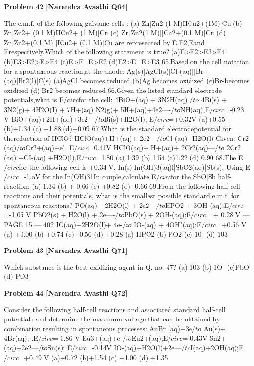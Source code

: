 \begin{problembox}
\textbf{Problem 42} \hfill \textbf{[Narendra Avasthi Q64]}
\label{q:ext-narendra_avasthi_all_questions-42}

The e.m.f. of the following galvanic cells :
(a) Zn|Zn$2$ (1 M)IICu2+(1M)|Cu
(b) Zn|Zn2+ (0.1 M)IICu2+ (1 M)|Cu
(c) Zn|Zn$2$(1 M)||Cu$2$+(0.1 M)|Cu
(d) Zn|Zn2+(0.1 M) |ICu2+ (0.1 M)|Cu
are represented by E,E2,Eand Erespectively.Which of the following statement is true?
(a)E>E2>E3>E4
(b)E3>E2>E>E4
(c)E>E=E>E2
(d)E2>E=E>E3
65.Based on the cell notation for a spontaneous reaction,at the anode:
Ag(s)|AgCl(s)|Cl-(aq)||Br-(aq)|Br2(l)|C(s)
(a)AgCl becomes reduced
(b)Ag becomes oxidized
(c)Br-becomes oxidized
(d) Br2 becomes reduced
66.Given the listed standard electrode potentials,what is E$/circ$for the cell:
4BiO+(aq) + 3N2H(aq) $/to$ 4Bi(s) + 3N2(g)+ 4H2O(I) + 7H+(aq)
N2(g)+ 5H+(aq)+4e$2$----$/to$NH(aq),E$/circ$=-0.23 V
BiO+(aq)+2H+(aq)+3e$2$---$/to$Bi(s)+H2O(l), E$/circ$=+0.32V
(a)+0.55
(b)+0.34
(c) +1.88
(d)+0.09
67.What is the standard electrodepotential for thereduction of HClO?
HClO(aq)+H+(aq)+ 2e$2$---$/to$Cl-(aq)+H2O(l)
Given:
Cr$2$(aq)$/to$Cr$2$+(aq)+e", E$/circ$=0.41V
HClO(aq)+ H+(aq)+ 2Cr$2$(aq)---$/to$ 2Cr$2$(aq) +CI-(aq) +H2O(l),E$/circ$=1.80
(a) 1.39
(b) 1.54
(c)1.22
(d) 0.90
68.The E$/circ$for the following cell is +0.34 V. In(s)|In(OH)3(aq)l|SbO2(aq)|Sb(s).
Using E$/circ$=-1.oV for the In(OH)31In couple,calculate E$/circ$for the SbO|Sb half-reaction:
(a)-1.34
(b) + 0.66
(c) +0.82
(d) -0.66
69.From the following half-cell reactions and their potentials, what is the smallest possible
standard e.m.f. for spontaneous reactions?
PO(aq)+ 2H2O(l) + 2e$2$---$/to$HPO2 + 3OH-(aq);E$/circ$=-1.05 V
PbO2(s) + H2O(l) + 2e----$/to$PbO(s) + 2OH-(aq);E$/circ$ =+ 0.28 V
--- PAGE 15 ---
402
IO(aq)+2H2O(l)+ 4e-$/to$ IO-(aq) + 4OH"(aq);E$/circ$=+0.56 V
(a) +0.00
(b) +0.74
(c)+0.56
(d) +0.28
(a) HPO2
(b) PO$2$
(c) 10-
(d) 103
\end{problembox}

\begin{problembox}
\textbf{Problem 43} \hfill \textbf{[Narendra Avasthi Q71]}
\label{q:ext-narendra_avasthi_all_questions-43}

Which substance is the best oxidizing agent in Q. no. 47?
(a) 103
(b) 1O-
(c)PbO
(d) PO3
\end{problembox}

\begin{problembox}
\textbf{Problem 44} \hfill \textbf{[Narendra Avasthi Q72]}
\label{q:ext-narendra_avasthi_all_questions-44}

Consider the following half-cell reactions and associated standard half-cell potentials and
determine the maximum voltage that can be obtained by combination resulting in
spontaneous processes:
AuBr (aq)+3e$/to$ Au(s)+ 4Br(aq); .E$/circ$=-0.86 V
Eu3+(aq)+e-$/to$Eu$2$+(aq);E$/circ$=-0.43V
Sn$2$+(aq)+2e$2$---$/to$Sn(s);
E$/circ$=-0.14V
IO-(aq)+H2O(l)+2e---$/to$I(aq)+2OH(aq);E$/circ$=+0.49 V
(a)+0.72
(b)+1.54
(c) +1.00
(d) +1.35
\end{problembox}

